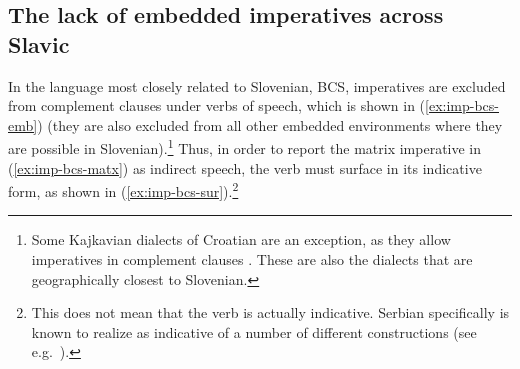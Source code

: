 \documentclass[output=paper,colorlinks,citecolor=brown]{langscibook}
\begin{document}
\subsection{The lack of embedded imperatives across Slavic}
\label{subsec:cross-slavic}

In the language most closely related to Slovenian, BCS, imperatives are excluded from complement clauses under verbs of speech, which is shown in (\ref{ex:imp-bcs-emb}) (they are also excluded from all other embedded environments where they are possible in Slovenian).\footnote{\label{ftn:kajkavian}Some Kajkavian dialects of Croatian are an exception, as they allow imperatives in complement clauses \citep{galic19}. These are also the dialects that are geographically closest to Slovenian.} Thus, in order to report the matrix imperative in (\ref{ex:imp-bcs-matx}) as indirect speech, the verb must surface in its indicative form, as shown in (\ref{ex:imp-bcs-sur}).\footnote{This does not mean that the verb is actually indicative. Serbian specifically is known to realize as indicative of a number of different constructions (see e.g.\ \cite{zec87,kaufmannetal23}).}

\ea \label{ex:imp-bcs} 
\z\z 
\end{document}
